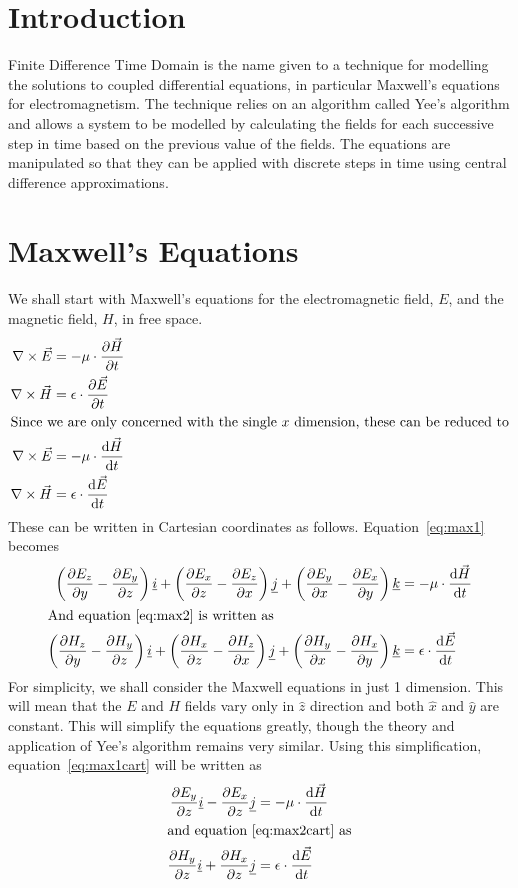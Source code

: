 
\section{Introduction} %
\label{sec:introduction}
Finite Difference Time Domain is the name given to a technique for modelling the solutions to coupled differential equations, in particular Maxwell's equations for electromagnetism. The technique relies on an algorithm called Yee's algorithm and allows a system to be modelled by calculating the fields for each successive step in time based on the previous value of the fields. The equations are manipulated so that they can be applied with discrete steps in time using central difference approximations.

\section{Maxwell's Equations} %
\label{sec:maxwell_s_equations}
We shall start with Maxwell's equations for the electromagnetic field, $E$, and the magnetic field, $H$, in free space.
\begin{align}
	\nabla \times \vec{E} &= -\mu\cdot\frac{\partial \vec{H}}{\partial t} \\
	\nabla \times \vec{H} &= \epsilon\cdot\frac{\partial \vec{E}}{\partial t} \\
	\intertext{Since we are only concerned with the single $x$ dimension, these can be reduced to}
	\nabla \times \vec{E} &= -\mu\cdot\frac{\textrm{d} \vec{H}}{\textrm{d} t} \label{eq:max1}\\
	\nabla \times \vec{H} &= \epsilon\cdot\frac{\textrm{d} \vec{E}}{\textrm{d} t} \label{eq:max2}
\end{align}
These can be written in Cartesian coordinates as follows. Equation~\ref{eq:max1} becomes
\begin{align}
	\left( \frac{\partial E_z}{\partial y}-\frac{\partial E_y}{\partial z} \right)\underline{i} + \left( \frac{\partial E_x}{\partial z}-\frac{\partial E_z}{\partial x} \right)\underline{j} + \left( \frac{\partial E_y}{\partial x}-\frac{\partial E_x}{\partial y} \right)\underline{k} &= -\mu\cdot\frac{\textrm{d} \vec{H}}{\textrm{d} t} \label{eq:max1cart}\\
	\intertext{And equation~\ref{eq:max2} is written as}
	\left( \frac{\partial H_z}{\partial y}-\frac{\partial H_y}{\partial z} \right)\underline{i} + \left( \frac{\partial H_x}{\partial z}-\frac{\partial H_z}{\partial x} \right)\underline{j} + \left( \frac{\partial H_y}{\partial x}-\frac{\partial H_x}{\partial y} \right)\underline{k} &= \epsilon\cdot\frac{\textrm{d} \vec{E}}{\textrm{d} t} \label{eq:max2cart}
\end{align}
For simplicity, we shall consider the Maxwell equations in just 1 dimension. This will mean that the $E$ and $H$ fields vary only in $\hat{z}$ direction and both $\hat{x}$ and $\hat{y}$ are constant. This will simplify the equations greatly, though the theory and application of Yee's algorithm remains very similar. Using this simplification, equation~\ref{eq:max1cart} will be written as
\begin{align}
	\frac{\partial E_y}{\partial z}\underline{i} - \frac{\partial E_x}{\partial z}\underline{j} &= -\mu\cdot\frac{\textrm{d} \vec{H}}{\textrm{d} t} \label{eq:max1z}\\
	\intertext{and equation~\ref{eq:max2cart} as}
	\frac{\partial H_y}{\partial z}\underline{i} + \frac{\partial H_x}{\partial z}\underline{j} &= \epsilon\cdot\frac{\textrm{d} \vec{E}}{\textrm{d} t} \label{eq:max2z}
\end{align}

